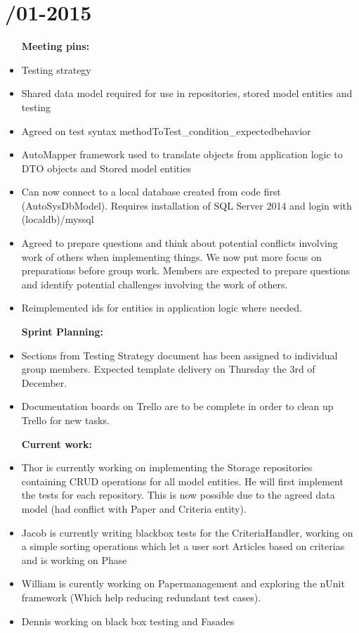 \section{/01-2015} %
\attend{\at}{\at}{\at}{\at}


\begin{itemize}
	\item [\textbf{Meeting pins:}]
	\item Testing strategy
	\item Shared data model required for use in repositories, stored model entities and testing 
	\item Agreed on test syntax methodToTest\_condition\_expectedbehavior
     \item AutoMapper framework used to translate objects from application logic to DTO objects and Stored model entities
     \item Can now connect to a local database created from code first (AutoSysDbModel). Requires installation of SQL Server 2014 and login with (localdb)/myssql 
     \item Agreed to prepare questions and think about potential conflicts involving work of others when implementing things. We now put more focus on preparations before group work. Members are expected to prepare questions and identify potential challenges involving the work of others. 
     \item Reimplemented ids for entities in application logic where needed. 
\end{itemize}

\begin{itemize}
	\item [\textbf{Sprint Planning:}]
	\item Sections from Testing Strategy document has been assigned to individual group members. Expected template delivery on Thursday the 3rd of December. 
     \item Documentation boards on Trello are to be complete in order to clean up Trello for new tasks. 
\end{itemize}

\begin{itemize}
	\item [\textbf{Current work:}]
	\item Thor is currently working on implementing the Storage repositories containing CRUD operations for all model entities. He will first implement the tests for each repository. This is now possible due to the agreed data model (had conflict with Paper and Criteria entity). 
	\item Jacob is currently writing blackbox tests for the CriteriaHandler, working on a simple sorting operations which let a user sort Articles based on criterias and is working on Phase
\item William is curently working on Papermanagement and exploring the nUnit framework (Which help reducing redundant test cases).
\item Dennis working on black box testing and Fasades
\end{itemize}